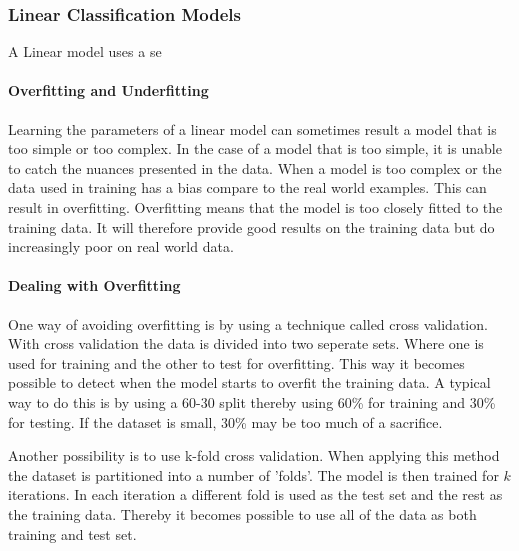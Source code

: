 \subsubsection{Linear Classification Models}



A Linear model uses a se






\paragraph{Overfitting and Underfitting}
Learning the parameters of a linear model can sometimes result a model that is too simple or too complex.
In the case of a model that is too simple, it is unable to catch the nuances presented in the data.
When a model is too complex or the data used in training has a bias compare to the real world examples.
This can result in overfitting.
Overfitting means that the model is too closely fitted to the training data.
It will therefore provide good results on the training data but do increasingly poor on real world data.

\paragraph{Dealing with Overfitting}

One way of avoiding overfitting is by using a technique called cross validation.
With cross validation the data is divided into two seperate sets.
Where one is used for training and the other to test for overfitting. 
This way it becomes possible to detect when the model starts to overfit the training data.
A typical way to do this is by using a 60-30 split thereby using 60\% for training and 30\% for testing.
If the dataset is small, 30\% may be too much of a sacrifice.

Another possibility is to use k-fold cross validation.
When applying this method the dataset is partitioned into a number of 'folds'.
The model is then trained for $k$ iterations.
In each iteration a different fold is used as the test set and the rest as the training data.
Thereby it becomes possible to use all of the data as both training and test set.
\begin{flushright}
\cite[p. 324]{AI2010}
\end{flushright}

